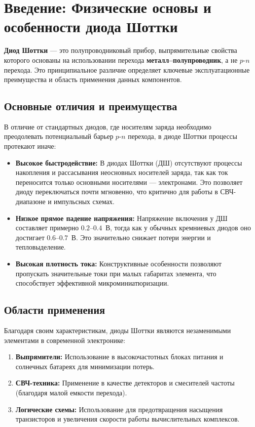 \documentclass[a4paper,12pt]{article}
\begin{document}
\tableofcontents
\clearpage 

\section{Введение: Физические основы и особенности диода Шоттки}

\textbf{Диод Шоттки} — это полупроводниковый прибор, выпрямительные свойства которого основаны на использовании перехода \textbf{металл--полупроводник}, а не $p\text{-}n$ перехода. Это принципиальное различие определяет ключевые эксплуатационные преимущества и область применения данных компонентов.

\subsection*{Основные отличия и преимущества}

В отличие от стандартных диодов, где носителям заряда необходимо преодолевать потенциальный барьер $p\text{-}n$ перехода, в диоде Шоттки процессы протекают иначе:

\begin{itemize}
    \item \textbf{Высокое быстродействие:} В диодах Шоттки (ДШ) отсутствуют процессы накопления и рассасывания неосновных носителей заряда, так как ток переносится только основными носителями — электронами. Это позволяет диоду переключаться почти мгновенно, что критично для работы в СВЧ-диапазоне и импульсных схемах.
    \item \textbf{Низкое прямое падение напряжения:} Напряжение включения у ДШ составляет примерно $0.2$--$0.4$~В, тогда как у обычных кремниевых диодов оно достигает $0.6$--$0.7$~В. Это значительно снижает потери энергии и тепловыделение.
    \item \textbf{Высокая плотность тока:} Конструктивные особенности позволяют пропускать значительные токи при малых габаритах элемента, что способствует эффективной микроминиатюризации.
\end{itemize}

\subsection*{Области применения}

Благодаря своим характеристикам, диоды Шоттки являются незаменимыми элементами в современной электронике:
\begin{enumerate}
    \item \textbf{Выпрямители:} Использование в высокочастотных блоках питания и солнечных батареях для минимизации потерь.
    \item \textbf{СВЧ-техника:} Применение в качестве детекторов и смесителей частоты (благодаря малой емкости перехода).
    \item \textbf{Логические схемы:} Использование для предотвращения насыщения транзисторов и увеличения скорости работы вычислительных комплексов.
\end{enumerate}
\end{document}
